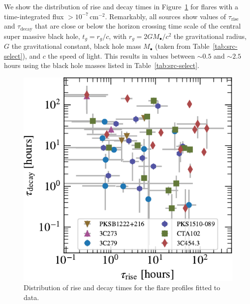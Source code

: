\documentclass[twocolumn,linenumbers]{aastex62}
\begin{document}
We show the distribution of rise and decay times in  Figure~\ref{fig:times-hist} for flares with a time-integrated flux $>10^{-7}\,\mathrm{cm}^{-2}$. 
Remarkably, all sources show values of $\tau_\mathrm{rise}$ and $\tau_\mathrm{decay}$ that are close or below the horizon crossing time scale of the central super massive black hole,
$t_g = r_g / c$, with $r_g = 2 G M_\bullet / c^2 $ the gravitational radius, $G$ the gravitational constant, black hole mass $M_\bullet$ (taken from Table~\ref{tab:src-select}), and $c$ the speed of light.
This results in values between $\sim0.5$ and $\sim2.5$ hours using the black hole masses listed in Table~\ref{tab:src-select}.

\begin{figure}
    \centering
    \includegraphics[width = .9\linewidth]{lcfithop_results_trise_vs_tdecay_orbit_maxiter2_fsys0p00_addcomp0.pdf}
    \caption{
    Distribution of rise and decay times for the flare profiles fitted to data. 
    }
    \label{fig:times-hist}
\end{figure}
\end{document}
